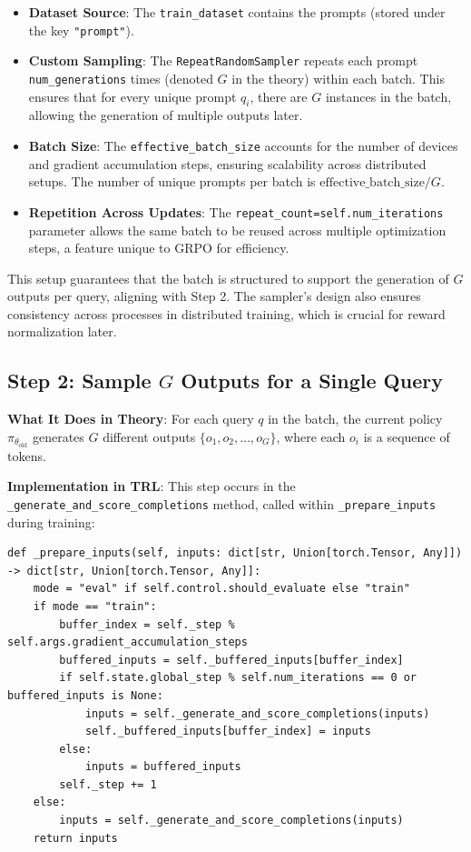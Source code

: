 \documentclass{article}
\begin{document}
\begin{itemize}
    \item \textbf{Dataset Source}: The \texttt{train\_dataset} contains the prompts (stored under the key \texttt{"prompt"}).
    
    \item \textbf{Custom Sampling}: The \texttt{RepeatRandomSampler} repeats each prompt \texttt{num\_generations} times (denoted \( G \) in the theory) within each batch. This ensures that for every unique prompt \( q_i \), there are \( G \) instances in the batch, allowing the generation of multiple outputs later.
    
    \item \textbf{Batch Size}: The \texttt{effective\_batch\_size} accounts for the number of devices and gradient accumulation steps, ensuring scalability across distributed setups. The number of unique prompts per batch is \( \text{effective\_batch\_size} / G \).
    
    \item \textbf{Repetition Across Updates}: The \texttt{repeat\_count=self.num\_iterations} parameter allows the same batch to be reused across multiple optimization steps, a feature unique to GRPO for efficiency.
\end{itemize}

This setup guarantees that the batch is structured to support the generation of \( G \) outputs per query, aligning with Step 2. The sampler’s design also ensures consistency across processes in distributed training, which is crucial for reward normalization later.

\subsection*{Step 2: Sample \( G \) Outputs for a Single Query}

\textbf{What It Does in Theory}: For each query \( q \) in the batch, the current policy \( \pi_{\theta_{\text{old}}} \) generates \( G \) different outputs \( \{o_1, o_2, \dots, o_G\} \), where each \( o_i \) is a sequence of tokens.

\textbf{Implementation in TRL}: This step occurs in the \texttt{\_generate\_and\_score\_completions} method, called within \texttt{\_prepare\_inputs} during training:

\begin{verbatim}
def _prepare_inputs(self, inputs: dict[str, Union[torch.Tensor, Any]]) -> dict[str, Union[torch.Tensor, Any]]:
    mode = "eval" if self.control.should_evaluate else "train"
    if mode == "train":
        buffer_index = self._step % self.args.gradient_accumulation_steps
        buffered_inputs = self._buffered_inputs[buffer_index]
        if self.state.global_step % self.num_iterations == 0 or buffered_inputs is None:
            inputs = self._generate_and_score_completions(inputs)
            self._buffered_inputs[buffer_index] = inputs
        else:
            inputs = buffered_inputs
        self._step += 1
    else:
        inputs = self._generate_and_score_completions(inputs)
    return inputs
\end{verbatim}
\end{document}
